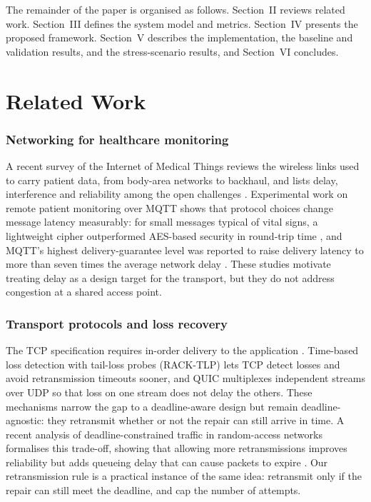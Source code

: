 \documentclass[10pt,twocolumn,letterpaper]{article}
\begin{document}
The remainder of the paper is organised as follows. Section~II reviews related work. Section~III defines the system model and metrics. Section~IV presents the proposed framework. Section~V describes the implementation, the baseline and validation results, and the stress-scenario results, and Section~VI concludes.

\section{Related Work}
\subsubsection{Networking for healthcare monitoring}
A recent survey of the Internet of Medical Things reviews the wireless links used to carry patient data, from body-area networks to backhaul, and lists delay, interference and reliability among the open challenges \cite{zhou2025}. Experimental work on remote patient monitoring over MQTT shows that protocol choices change message latency measurably: for small messages typical of vital signs, a lightweight cipher outperformed AES-based security in round-trip time \cite{ahmad2024}, and MQTT's highest delivery-guarantee level was reported to raise delivery latency to more than seven times the average network delay \cite{borsatti2020}. These studies motivate treating delay as a design target for the transport, but they do not address congestion at a shared access point.

\subsubsection{Transport protocols and loss recovery}
The TCP specification requires in-order delivery to the application \cite{rfc9293}. Time-based loss detection with tail-loss probes (RACK-TLP) \cite{rfc8985} lets TCP detect losses and avoid retransmission timeouts sooner, and QUIC \cite{rfc9000,rfc9002} multiplexes independent streams over UDP so that loss on one stream does not delay the others. These mechanisms narrow the gap to a deadline-aware design but remain deadline-agnostic: they retransmit whether or not the repair can still arrive in time. A recent analysis of deadline-constrained traffic in random-access networks formalises this trade-off, showing that allowing more retransmissions improves reliability but adds queueing delay that can cause packets to expire \cite{nomikos2024}. Our retransmission rule is a practical instance of the same idea: retransmit only if the repair can still meet the deadline, and cap the number of attempts.
\end{document}

